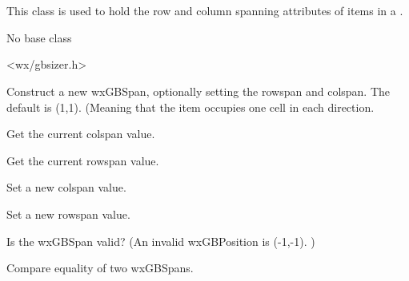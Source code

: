
\section{}\label{wxgbspan}

This class is used to hold the row and column spanning attributes of
items in a .


No base class


<wx/gbsizer.h>


\label{wxgbspanwxgbspan}



Construct a new wxGBSpan, optionally setting the rowspan and colspan.
The default is (1,1).  (Meaning that the item occupies one cell in
each direction.

\label{wxgbspangetcolspan}


Get the current colspan value.

\label{wxgbspangetrowspan}


Get the current rowspan value.

\label{wxgbspansetcolspan}


Set a new colspan value.

\label{wxgbspansetrowspan}


Set a new rowspan value.

\label{wxgbspanoperatorunknown}


Is the wxGBSpan valid?  (An invalid wxGBPosition is (-1,-1). )

\label{wxgbspanoperatorequal}


Compare equality of two wxGBSpans.

